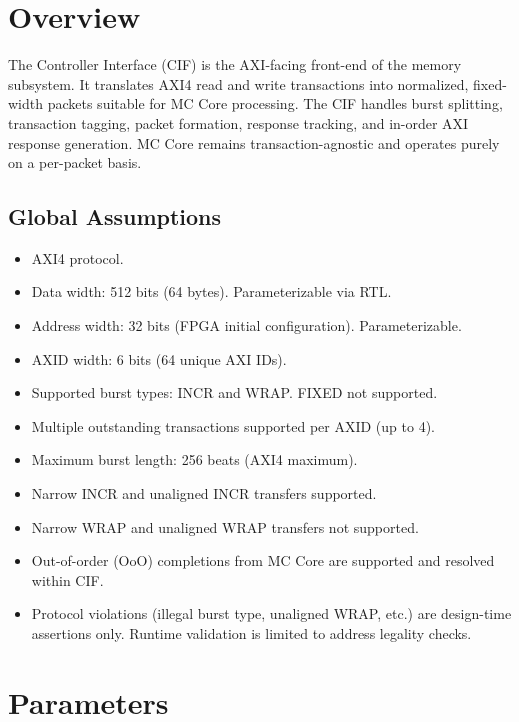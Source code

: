 \section{Overview}

The Controller Interface (CIF) is the AXI-facing front-end of the memory subsystem. It translates AXI4 read and write transactions into normalized, fixed-width packets suitable for MC Core processing. The CIF handles burst splitting, transaction tagging, packet formation, response tracking, and in-order AXI response generation. MC Core remains transaction-agnostic and operates purely on a per-packet basis.

\subsection{Global Assumptions}

\begin{itemize}[noitemsep]
    \item AXI4 protocol.
    \item Data width: 512 bits (64 bytes). Parameterizable via RTL.
    \item Address width: 32 bits (FPGA initial configuration). Parameterizable.
    \item AXID width: 6 bits (64 unique AXI IDs).
    \item Supported burst types: INCR and WRAP. FIXED not supported.
    \item Multiple outstanding transactions supported per AXID (up to 4).
    \item Maximum burst length: 256 beats (AXI4 maximum).
    \item Narrow INCR and unaligned INCR transfers supported.
    \item Narrow WRAP and unaligned WRAP transfers not supported.
    \item Out-of-order (OoO) completions from MC Core are supported and resolved within CIF.
    \item Protocol violations (illegal burst type, unaligned WRAP, etc.) are design-time assertions only. Runtime validation is limited to address legality checks.
\end{itemize}

\section{Parameters}

